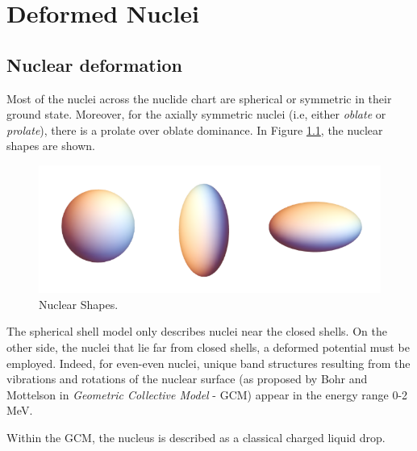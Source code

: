 \chapter{Deformed Nuclei}

\section{Nuclear deformation}

Most of the nuclei across the nuclide chart are spherical or symmetric in their ground state. Moreover, for the axially symmetric nuclei (i.e, either \emph{oblate} or \emph{prolate}), there is a prolate over oblate dominance. In Figure \ref{nuclear_shapes}, the nuclear shapes are shown.

\begin{figure}[ht]
    \centering
    \includegraphics[scale=0.3]{Chapters/Figures/nuclear_shapes.png}
    \caption{Nuclear Shapes.}
    \label{nuclear_shapes}
\end{figure}

The spherical shell model only describes nuclei near the closed shells. On the other side, the nuclei that lie far from closed shells, a deformed potential must be employed. Indeed, for even-even nuclei, unique band structures resulting from the vibrations and rotations of the nuclear surface (as proposed by Bohr and Mottelson \cite{bohr1998nuclear} in \emph{Geometric Collective Model} - GCM) appear in the energy range 0-2 MeV.

Within the GCM, the nucleus is described as a classical charged liquid drop.